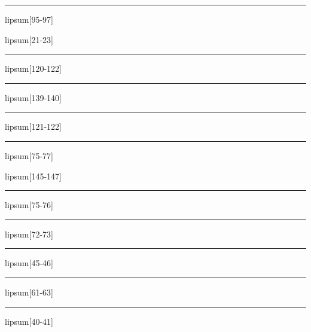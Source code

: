\documentclass[11pt,a4paper]{article}
\begin{document}
\begin{simplewrap}
  \textcolor{magenta!46}{\rule{4.1cm}{9.8cm}}
\end{simplewrap}
lipsum[95-97]

lipsum[21-23]

\begin{simplewrap}
  \textcolor{purple!56}{\rule{5.2cm}{9.9cm}}
\end{simplewrap}
lipsum[120-122]

\begin{simplewrap}
  \textcolor{cyan!49}{\rule{3.3cm}{5.8cm}}
\end{simplewrap}
lipsum[139-140]

\begin{simplewrap}
  \textcolor{violet!49}{\rule{3.2cm}{4.7cm}}
\end{simplewrap}
lipsum[121-122]

\begin{simplewrap}
  \textcolor{red!46}{\rule{5.2cm}{5.4cm}}
\end{simplewrap}
lipsum[75-77]

lipsum[145-147]

\begin{simplewrap}
  \textcolor{teal!13}{\rule{4.9cm}{6.6cm}}
\end{simplewrap}
lipsum[75-76]

\begin{simplewrap}
  \textcolor{red!28}{\rule{4.5cm}{3.0cm}}
\end{simplewrap}
lipsum[72-73]

\begin{simplewrap}
  \textcolor{teal!27}{\rule{5.6cm}{2.1cm}}
\end{simplewrap}
lipsum[45-46]

\begin{simplewrap}
  \textcolor{purple!52}{\rule{4.3cm}{8.5cm}}
\end{simplewrap}
lipsum[61-63]

\begin{simplewrap}
  \textcolor{cyan!12}{\rule{4.0cm}{2.7cm}}
\end{simplewrap}
lipsum[40-41]
\end{document}
